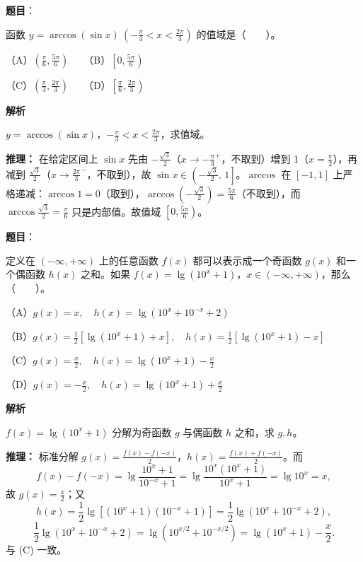 \begin{answer}

\textbf{题目}：

函数 $y=\arccos(\sin x)\ \left(-\frac\pi3<x<\frac{2\pi}3\right)$ 的值域是\mbox{（　　）}。

（A）$\left(\frac\pi6,\frac{5\pi}6\right)$　　（B）$\left[0,\frac{5\pi}6\right)$

（C）$\left(\frac\pi3,\frac{2\pi}3\right)$　　（D）$\left[\frac\pi6,\frac{2\pi}3\right)$

\textbf{解析}

$y=\arccos(\sin x)$，$-\frac\pi3<x<\frac{2\pi}3$，求值域。

\textbf{推理：} 在给定区间上 $\sin x$ 先由 $-\frac{\sqrt3}2$（$x\to-\frac\pi3^+$，不取到）增到 1（$x=\frac\pi2$），再减到 $\frac{\sqrt3}2$（$x\to\frac{2\pi}3^-$，不取到），故 $\sin x\in\left(-\frac{\sqrt3}2,\,1\right]$。$\arccos$ 在 $[-1,1]$ 上严格递减：$\arccos 1=0$（取到），$\arccos\left(-\frac{\sqrt3}2\right)=\frac{5\pi}6$（不取到），而 $\arccos\frac{\sqrt3}2=\frac\pi6$ 只是内部值。故值域 $\left[0,\frac{5\pi}6\right)$。


\end{answer}
\begin{answer}

\textbf{题目}：

定义在 $(-\infty,+\infty)$ 上的任意函数 $f(x)$ 都可以表示成一个奇函数 $g(x)$ 和一个偶函数 $h(x)$ 之和。如果 $f(x)=\lg(10^x+1)$，$x\in(-\infty,+\infty)$，那么\mbox{（　　）}。

（A）$g(x)=x,\quad h(x)=\lg(10^x+10^{-x}+2)$

（B）$g(x)=\frac12[\lg(10^x+1)+x],\quad h(x)=\frac12[\lg(10^x+1)-x]$

（C）$g(x)=\frac{x}{2},\quad h(x)=\lg(10^x+1)-\frac{x}{2}$

（D）$g(x)=-\frac{x}{2},\quad h(x)=\lg(10^x+1)+\frac{x}{2}$

\textbf{解析}

$f(x)=\lg(10^x+1)$ 分解为奇函数 $g$ 与偶函数 $h$ 之和，求 $g,h$。

\textbf{推理：} 标准分解 $g(x)=\frac{f(x)-f(-x)}2$，$h(x)=\frac{f(x)+f(-x)}2$。而
\nopagebreak[4]
\[f(x)-f(-x)=\lg\frac{10^x+1}{10^{-x}+1}=\lg\frac{10^x(10^x+1)}{10^x+1}=\lg10^x=x,\]
故 $g(x)=\frac x2$；又
\nopagebreak[4]
\[h(x)=\frac12\lg\left[(10^x+1)(10^{-x}+1)\right]=\frac12\lg(10^x+10^{-x}+2),\]
\nopagebreak[4]
\[\frac12\lg(10^x+10^{-x}+2)=\lg\left(10^{x/2}+10^{-x/2}\right)=\lg(10^x+1)-\frac x2.\]
与 (C) 一致。


\par\medskip

\end{answer}
